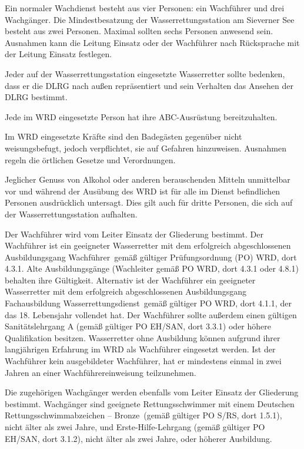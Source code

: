 
\renewcommand{\dienstanweisung}{DA\,4-01/2013}
\thispagestyle{scrheadings}
Ein normaler Wachdienst besteht aus vier Personen: ein Wachführer und drei Wachgänger. Die Mindestbesatzung der Wasserrettungsstation am Sieverner See besteht aus zwei Personen. Maximal sollten sechs Personen anwesend sein. Ausnahmen kann die Leitung Einsatz oder der Wachführer nach Rücksprache mit der Leitung Einsatz festlegen.

Jeder auf der Wasserrettungsstation eingesetzte Wasserretter sollte bedenken, dass er die DLRG nach außen repräsentiert und sein Verhalten das Ansehen der DLRG bestimmt.

Jede im WRD eingesetzte Person hat ihre ABC-Ausrüstung bereitzuhalten.

Im WRD eingesetzte Kräfte sind den Badegästen gegenüber nicht weisungsbefugt, jedoch verpflichtet, sie auf Gefahren hinzuweisen.  Ausnahmen regeln die örtlichen Gesetze und Verordnungen.

Jeglicher Genuss von Alkohol oder anderen berauschenden Mitteln unmittelbar vor und während der Ausübung des WRD ist für alle im Dienst befindlichen Personen ausdrücklich untersagt. Dies gilt auch für dritte Personen, die sich auf der Wasserrettungsstation aufhalten.

Der Wachführer wird vom Leiter Einsatz der Gliederung bestimmt. Der Wachführer ist ein geeigneter Wasserretter mit dem erfolgreich abgeschlossenen Ausbildungsgang \glqq Wachführer\grqq\, gemäß gültiger Prüfungsordnung (PO) WRD, dort 4.3.1. Alte Ausbildungsgänge (Wachleiter gemäß PO WRD, dort 4.3.1 oder 4.8.1) behalten ihre Gültigkeit. Alternativ ist der Wachführer ein geeigneter Wasserretter mit dem erfolgreich abgeschlossenen Ausbildungsgang \glqq Fachausbildung Wasserrettungsdienst\grqq\, gemäß gültiger PO WRD, dort 4.1.1, der das 18. Lebensjahr vollendet hat. Der Wachführer sollte außerdem einen gültigen Sanitätslehrgang A (gemäß gültiger PO EH/SAN, dort 3.3.1) oder höhere Qualifikation besitzen. Wasserretter ohne Ausbildung können aufgrund ihrer langjährigen Erfahrung im WRD als Wachführer eingesetzt werden. Ist der Wachführer kein ausgebildeter Wachführer, hat er mindestens einmal in zwei Jahren an einer Wachführereinweisung teilzunehmen.

Die zugehörigen Wachgänger werden ebenfalls vom Leiter Einsatz der Gliederung bestimmt. Wachgänger sind geeignete Rettungsschwimmer mit einem \glqq Deutschen Rettungsschwimmabzeichen – Bronze\grqq\, (gemäß gültiger PO S/RS, dort 1.5.1), nicht älter als zwei Jahre, und Erste-Hilfe-Lehrgang (gemäß gültiger PO EH/SAN, dort 3.1.2), nicht älter als zwei Jahre, oder höherer Ausbildung.

